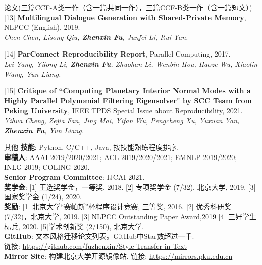 \documentclass{resume} %
\begin{document}
\begin{rSection}{论文(三篇CCF-A类一作（含一篇共同一作），三篇CCF-B类一作（含一篇短文）)}
    [13] \textbf{Multilingual Dialogue Generation with Shared-Private Memory}, NLPCC (English), 2019. \\
    {\it Chen Chen, Lisong Qiu, \textbf{Zhenxin Fu}, Junfei Li, Rui Yan. }
    \vspace{-0.1cm}

    [14] \textbf{ParConnect Reproducibility Report}, Parallel Computing, 2017.\\
    {\it Lei Yang, Yilong Li, \textbf{Zhenxin Fu}, Zhuohan Li, Wenbin Hou, Haoze Wu, Xiaolin Wang, Yun Liang.}
    \vspace{-0.1cm}

    [15] \textbf{Critique of ``Computing Planetary Interior Normal Modes with a Highly Parallel Polynomial Filtering Eigensolver" by SCC Team from Peking University}, IEEE TPDS Special Issue about Reproducibility, 2021. \\
    {\it Yihua Cheng, Zejia Fan, Jing Mai, Yifan Wu, Pengcheng Xu, Yuxuan Yan, \textbf{Zhenxin Fu}, Yun Liang.}
    \vspace{-0.1cm}
\end{rSection}

\vspace{-0.2cm}
\begin{rSection}{其他}
    \textbf{技能}: Python, C/C++, Java, 按技能熟练程度排序. \\
    \textbf{审稿人}: AAAI-2019/2020/2021; ACL-2019/2020/2021; EMNLP-2019/2020; INLG-2019; COLING-2020. \\
    \textbf{Senior Program Committee}: IJCAI 2021. \\
    \textbf{奖学金}: [1] 王选奖学金，一等奖, 2018. [2] 专项奖学金 (7/32), 北京大学, 2019. [3] 国家奖学金 (1/24), 2020.\\
    \textbf{奖励}: [1] 北京大学``赛帕斯''杯程序设计竞赛, 三等奖, 2016. [2] 优秀科研奖 (7/32)，北京大学, 2019. [3] NLPCC Outstanding Paper Award,2019 [4] 三好学生标兵, 2020. [5]学术创新奖 (2/150), 北京大学.\\
    \textbf{GitHub}: 文本风格迁移论文列表。GitHub中Star数超过一千. \\链接: \url{https://github.com/fuzhenxin/Style-Transfer-in-Text}\\
    \textbf{Mirror Site}: 构建北京大学开源镜像站. 链接: \url{https://mirrors.pku.edu.cn}
\end{rSection}
\end{document}
